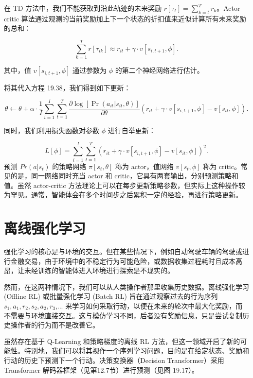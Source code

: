 \documentclass[lang=cn,newtx,10pt,scheme=chinese]{elegantbook}
\begin{document}
在 TD 方法中，我们不能获取到沿此轨迹的未来奖励 \(r[\tau_t] = \sum_{k=t}^T r_k\)。Actor-critic 算法通过观测的当前奖励加上下一个状态的折扣值来近似计算所有未来奖励的总和：

\begin{equation}
\sum_{k=1}^{T} r[\tau_{ik}] \approx r_{it} + \gamma \cdot v[s_{i,t+1}, \phi]. 
\end{equation}

其中，值 \(v[s_{i,t+1}, \phi]\) 通过参数为 \(\phi\) 的第二个神经网络进行估计。

将其代入方程 19.38，我们得到如下更新：

\begin{equation}
\theta \leftarrow \theta + \alpha \cdot \frac{1}{I} \sum_{i=1}^{I} \sum_{t=1}^{T} \frac{\partial \log[\Pr(a_{it}|s_{it}, \theta)]}{\partial \theta} (r_{it} + \gamma \cdot v[s_{i,t+1}, \phi] - v[s_{it}, \phi]). 
\end{equation}

同时，我们利用损失函数对参数 \(\phi\) 进行自举更新：

\begin{equation}
L[\phi] = \sum_{i=1}^{I} \sum_{t=1}^{T} \left( r_{it} + \gamma \cdot v[s_{i,t+1}, \phi] - v[s_{it}, \phi] \right)^2. 
\end{equation}
预测 \(Pr(a|s_t)\) 的策略网络 \(\pi[s_t,\theta]\) 称为 actor，值网络 \(v[s_t,\phi]\) 称为 critic。常见的是，同一网络同时充当 actor 和 critic，它具有两套输出，分别预测策略和值。虽然 actor-critic 方法理论上可以在每步更新策略参数，但实际上这种操作较为罕见。通常，智能体会在多个时间步之后累积一定的经验，再进行策略更新。

\section{离线强化学习}
强化学习的核心是与环境的交互。但在某些情况下，例如自动驾驶车辆的驾驶或进行金融交易，由于环境中的不稳定行为可能危险，或数据收集过程耗时且成本高昂，让未经训练的智能体进入环境进行探索是不现实的。

然而，在这两种情况下，我们可以从人类操作者那里收集历史数据。离线强化学习 (Offline RL) 或批量强化学习 (Batch RL) 旨在通过观察过去的行为序列 \(s_1,a_1,r_2,s_2,a_2,r_3\),... 来学习如何采取行动，以便在未来的轮次中最大化奖励，而不需要与环境直接交互。这与模仿学习不同，后者没有奖励信息，只是尝试复制历史操作者的行为而不是改善它。

虽然存在基于 Q-Learning 和策略梯度的离线 RL 方法，但这一领域开启了新的可能性。特别地，我们可以将其视作一个序列学习问题，目的是在给定状态、奖励和行动的历史下预测下一个行动。决策变换器（Decision Transformer）采用 Transformer 解码器框架（见第12.7节）进行预测（见图 19.17）。
\end{document}
